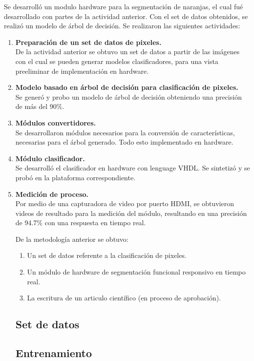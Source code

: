 \documentclass[twoside,spanish,ESP,MSc]{plantillaLabUPV}
\theoremstyle{definition}
\begin{document}
Se desarrolló un modulo hardware para la segmentación de naranjas, el cual fué desarrollado con partes de la actividad anterior. Con el set de datos obtenidos, se realizó un modelo de árbol de decisión. Se realizaron las siguientes actividades:

\begin{enumerate}
	\item \textbf{Preparación de un set de datos de pixeles.}\\
	De la actividad anterior se obtuvo un set de datos a partir de las imágenes con el cual se pueden generar modelos clasificadores, para una vista preeliminar de implementación en hardware.
	\item \textbf{Modelo basado en árbol de decisión para clasificación de pixeles.}\\
	Se generó y probo un modelo de árbol de decisión obteniendo una precisión de más del 90\%.
	\item \textbf{Módulos convertidores.}\\
	Se desarrollaron módulos necesarios para la conversión de características, necesarias para el árbol generado. Todo esto implementado en hardware.
	\item \textbf{Módulo clasificador.}\\
	Se desarrolló el clasificador en hardware con lenguage VHDL. Se sintetizó y se probó en la plataforma correspondiente.
	\item \textbf{Medición de proceso.}\\
	Por medio de una capturadora de video por puerto HDMI, se obtuvieron videos de resultado para la medición del módulo, resultando en una precisión de 94.7\% con una respuesta en tiempo real.
	
	De la metodología anterior se obtuvo:
	
	\begin{enumerate}
		\item Un set de datos referente a la clasificación de pixeles.
		\item Un módulo de hardware de segmentación funcional responsivo en tiempo real.
		\item La escritura de un articulo científico (en proceso de aprobación).
	\end{enumerate}
	\subsection{Set de datos}
	\subsection{Entrenamiento}
	

\end{enumerate}
\end{document}
